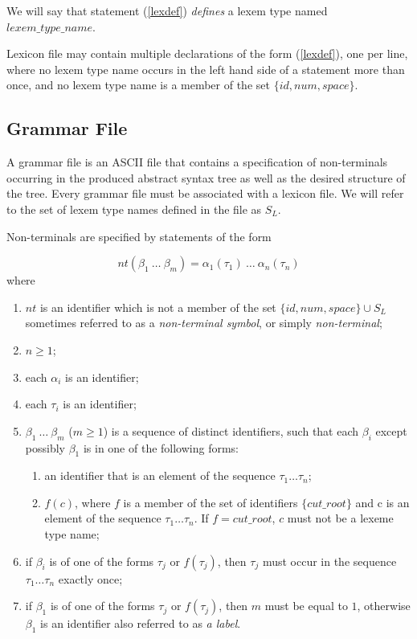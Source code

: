 \documentclass[a4paper,10pt]{article}
\begin{document}
We will say that statement (\ref{lexdef}) \textit{defines} a lexem type named $lexem\_type\_name$.

Lexicon file may contain multiple declarations of the form (\ref{lexdef}), one per line, where no lexem type name occurs in the left hand side of a statement more than once, and no lexem type name is a member of the set $\{id, num, space\}  $.

 
\subsection{Grammar File}\label{gf}
A grammar file is an ASCII file that contains a specification of non-terminals occurring in the produced abstract syntax tree as well as the desired structure of the tree. Every grammar file must be associated with a lexicon file. We will refer to the set of lexem type names defined in the file as $S_L$.  


Non-terminals are specified  by  statements of the form 

\begin{equation}\label{nontd}
nt(\beta_1~\ldots~\beta_m) = \alpha_1(\tau_1)~\ldots~\alpha_n(\tau_n) 
\end{equation}
where 
\begin{enumerate}
\item $nt$ is an identifier which is not a member of the set $\{id, num, space\}\cup S_L$ sometimes referred to as a \textit{non-terminal symbol}, or simply \textit{non-terminal};
\item $n\ge 1$;
\item each $\alpha_i$  is an identifier;
\item each $\tau_i$ is an identifier;
\item $\beta_1~\ldots~\beta_m$ ($m \ge 1$) is a sequence of distinct identifiers, 
such that each  $\beta_i$ except possibly $\beta_1$   
is in one of the following forms:
\begin{enumerate}
\item an identifier that is an element of the sequence   $\tau_1\ldots \tau_n$;
\item $f(c)$, where $f$ is a member of the set of identifiers $\{cut\_root\}$ and c is an element of  the sequence   $\tau_1\ldots \tau_n$.
If $f = cut\_root$, $c$ must not be a lexeme type name;
\end{enumerate} 
\item  if $\beta_i$ is of one of the forms $\tau_j$ or $f(\tau_j)$, then  $\tau_j$ must occur in the sequence  $\tau_1\ldots \tau_n$ exactly once;
\item if $\beta_1$ is of one of the forms $\tau_j$ or $f(\tau_j)$, then $m$ must be equal to $1$, otherwise $\beta_1$ is an identifier also referred to as \textit{a label}.
\end{enumerate}
\end{document}
